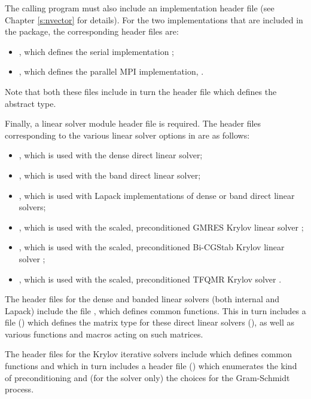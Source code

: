 The calling program must also include an {\nvector} implementation header file
(see Chapter \ref{s:nvector} for details).
For the two {\nvector} implementations that are included in the {\ida} package,
the corresponding header files are:
\begin{itemize}
\item {}, 
  which defines the serial implementation {\nvecs};
\item {}, 
  which defines the parallel MPI implementation, {\nvecp}.
\end{itemize}
Note that both these files include in turn the header file  which 
defines the abstract  type. 

Finally, a linear solver module header file is required. 
The header files corresponding to the various linear solver options in {\ida} are
as follows:
\begin{itemize}
\item {}, 
  which is used with the dense direct linear solver;

\item {}, 
  which is used with the band direct linear solver;

\item {},
  which is used with Lapack implementations of dense or band direct linear solvers;
  
\item {}, 
  which is used with the scaled, preconditioned GMRES Krylov linear solver {\spgmr};

\item {}, 
  which is used with the scaled, preconditioned Bi-CGStab Krylov linear solver {\spbcg};

\item {}, 
  which is used with the scaled, preconditioned TFQMR Krylov solver {\sptfqmr}.
\end{itemize}

The header files for the dense and banded linear solvers (both
internal and Lapack) include the file , which
defines common functions.  This in turn includes a file
() which defines the matrix type for these
direct linear solvers (), as well as various functions and
macros acting on such matrices.

The header files for the Krylov iterative solvers include 
which defines common functions and which in turn includes a header file ()
which enumerates the kind of preconditioning and (for the {\spgmr} solver only) the choices for the Gram-Schmidt process.

